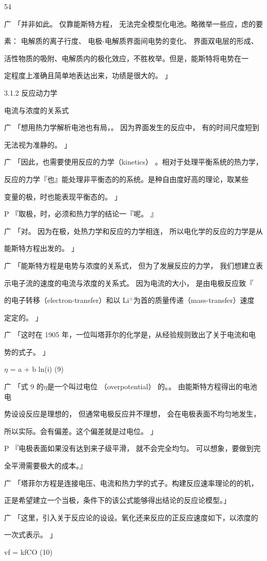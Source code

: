 54\par
广 「并非如此。 仅靠能斯特方程， 无法完全模型化电池。略微举一些应，虑的要\par
素： 电解质的离子行度、 电极-电解质界面间电势的变化、 界面双电层的形成、\par
活性物质的吸附、电解质内的极化效应，不胜枚举。但是，能斯特将电势在一\par
定程度上准确且简单地表达出来，功绩是很大的。 」\par
3.1.2 反应动力学\par
电流与浓度的关系式\par
广 「想用热力学解析电池也有局，。 因为界面发生的反应中， 有的时间尺度短到\par
无法视为准静的。 」\par
广 「因此，也需要使用反应的力学（kinetics） 。相对于处理平衡系统的热力学，\par
反应的力学『也』能处理非平衡态的的系统。是种自由度好高的理论，取某些\par
变量的极，时也能表现平衡态的。 」\par
P 『取极，时，必须和热力学的结论一『呢。 』\par
广 「对。 因为在极，处热力学和反应的力学相连， 所以电化学的反应的力学是从\par
能斯特方程出发的。 」\par
广 「能斯特方程是电势与浓度的关系式， 但为了发展反应的力学， 我们想建立表\par
示电子流的速度的电流与浓度的关系式。 因为电流的大小， 是由电极反应致『\par
的电子转移（electron-transfer）和以 Li$^{+}$为首的质量传递（mass-transfer）速度\par
定定的。 」\par
广 「这时在 1905 年，一位叫塔菲尔的化学是，从经验规则致出了关于电流和电\par
势的式子。 」\par
$\eta$ = a + b ln(i) (9)\par
广 「式 9 的$\eta$是一个叫过电位 （overpotential） 的。。 由能斯特方程得出的电池电\par
势设设反应是理想的， 但通常电极反应并不理想， 会在电极表面不均匀地发生，\par
所以实际。会有偏差。这个偏差就是过电位。 」\par
P 『电极表面如果没有达到来子级平滑， 就不会完全均匀。 可以想象，要做到完\par
全平滑需要极大的成本。』\par
广 「塔菲尔方程是连接电压、电流和热力学的式子。构建反应速率理论的的机，\par
正是希望建立一个当极，条件下的该公式能够得出结论的反应论模型。」\par
广 「这里，引入关于反应论的设设。氧化还来反应的正反应速度如下，以浓度的\par
一次式表示。 」\par
vf = kfCO (10)\par

